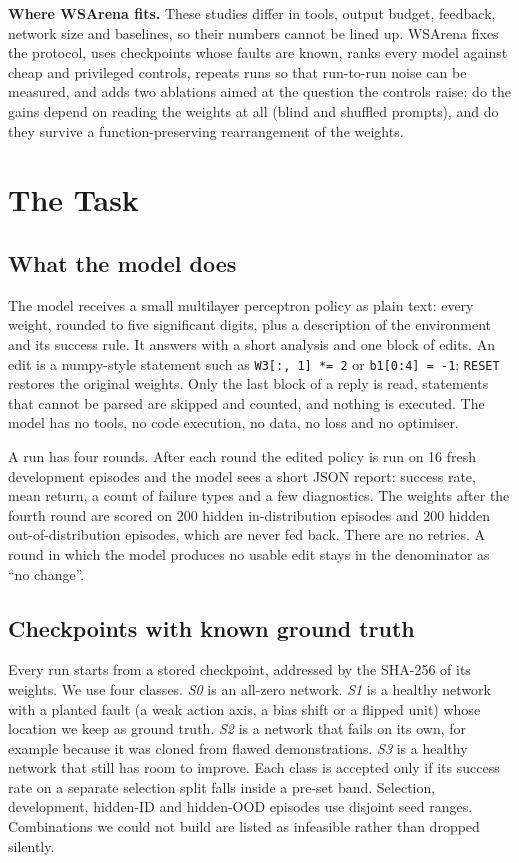 \documentclass[conference]{IEEEtran}
\begin{document}
\textbf{Where WSArena fits.} These studies differ in tools, output budget, feedback, network size and baselines, so their numbers cannot be lined up. WSArena fixes the protocol, uses checkpoints whose faults are known, ranks every model against cheap and privileged controls, repeats runs so that run-to-run noise can be measured, and adds two ablations aimed at the question the controls raise: do the gains depend on reading the weights at all (blind and shuffled prompts), and do they survive a function-preserving rearrangement of the weights.

\section{The Task}
\subsection{What the model does}
The model receives a small multilayer perceptron policy as plain text: every weight, rounded to five significant digits, plus a description of the environment and its success rule. It answers with a short analysis and one block of edits. An edit is a numpy-style statement such as \texttt{W3[:, 1] *= 2} or \texttt{b1[0:4] = -1}; \texttt{RESET} restores the original weights. Only the last block of a reply is read, statements that cannot be parsed are skipped and counted, and nothing is executed. The model has no tools, no code execution, no data, no loss and no optimiser.

A run has four rounds. After each round the edited policy is run on 16 fresh development episodes and the model sees a short JSON report: success rate, mean return, a count of failure types and a few diagnostics. The weights after the fourth round are scored on 200 hidden in-distribution episodes and 200 hidden out-of-distribution episodes, which are never fed back. There are no retries. A round in which the model produces no usable edit stays in the denominator as ``no change''.

\subsection{Checkpoints with known ground truth}
Every run starts from a stored checkpoint, addressed by the SHA-256 of its weights. We use four classes. \emph{S0} is an all-zero network. \emph{S1} is a healthy network with a planted fault (a weak action axis, a bias shift or a flipped unit) whose location we keep as ground truth. \emph{S2} is a network that fails on its own, for example because it was cloned from flawed demonstrations. \emph{S3} is a healthy network that still has room to improve. Each class is accepted only if its success rate on a separate selection split falls inside a pre-set band. Selection, development, hidden-ID and hidden-OOD episodes use disjoint seed ranges. Combinations we could not build are listed as infeasible rather than dropped silently.
\end{document}
